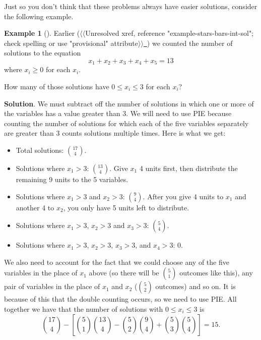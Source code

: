 \documentclass[10pt,]{book}
\theoremstyle{plain}
\theoremstyle{definition}
\theoremstyle{definition}
\newtheorem{example}[theorem]{Example}
\theoremstyle{definition}
\theoremstyle{definition}
\numberwithin{equation}{chapter}
\begin{document}
\hypertarget{p-855}{}%
Just so you don't think that these problems always have easier solutions, consider the following example.%
\begin{example}[]\label{example-13}
\hypertarget{p-856}{}%
Earlier ({$\langle\langle$Unresolved xref, reference "example-stars-bars-int-sol"; check spelling or use "provisional" attribute$\rangle\rangle$}\hyperlink{}{~}) we counted the number of solutions to the equation%
\begin{equation*}
x_1 + x_2 + x_3 + x_4 + x_5 = 13
\end{equation*}
where \(x_i \ge 0\) for each \(x_i\).%
\par
\hypertarget{p-857}{}%
How many of those solutions have \(0 \le x_i \le 3\) for each \(x_i\)?%
\par\smallskip%
\noindent\textbf{Solution}.\hypertarget{solution-78}{}\quad%
\hypertarget{p-858}{}%
We must subtract off the number of solutions in which one or more of the variables has a value greater than 3. We will need to use PIE because counting the number of solutions for which each of the five variables separately are greater than 3 counts solutions multiple times. Here is what we get:%
\par
\hypertarget{p-859}{}%
\leavevmode%
\begin{itemize}[label=\textbullet]
\item{}\hypertarget{p-860}{}%
Total solutions: \({17 \choose 4}\).%
\item{}\hypertarget{p-861}{}%
Solutions where \(x_1 > 3\): \({13 \choose 4}\). Give \(x_1\) 4 units first, then distribute the remaining 9 units to the 5 variables.%
\item{}\hypertarget{p-862}{}%
Solutions where \(x_1 > 3\) and \(x_2 > 3\): \({9 \choose 4}\). After you give 4 units to \(x_1\) and another 4 to \(x_2\), you only have 5 units left to distribute.%
\item{}\hypertarget{p-863}{}%
Solutions where \(x_1 > 3\), \(x_2 > 3\) and \(x_3 > 3\): \({5 \choose 4}\).%
\item{}\hypertarget{p-864}{}%
Solutions where \(x_1 > 3\), \(x_2 > 3\), \(x_3 > 3\), and \(x_4 > 3\): 0.%
\end{itemize}
%
\par
\hypertarget{p-865}{}%
We also need to account for the fact that we could choose any of the five variables in the place of \(x_1\) above (so there will be \({5 \choose 1}\) outcomes like this), any pair of variables in the place of \(x_1\) and \(x_2\) (\({5 \choose 2}\) outcomes) and so on. It is because of this that the double counting occurs, so we need to use PIE. All together we have that the number of solutions with \(0 \le x_i \le 3\) is%
\begin{equation*}
{17 \choose 4} - \left[{5\choose 1}{13 \choose 4} - {5 \choose 2}{9 \choose 4} + {5 \choose 3}{5 \choose 4}\right] = 15.
\end{equation*}
%
\end{example}
\typeout{************************************************}
\typeout{************************************************}
\end{document}
